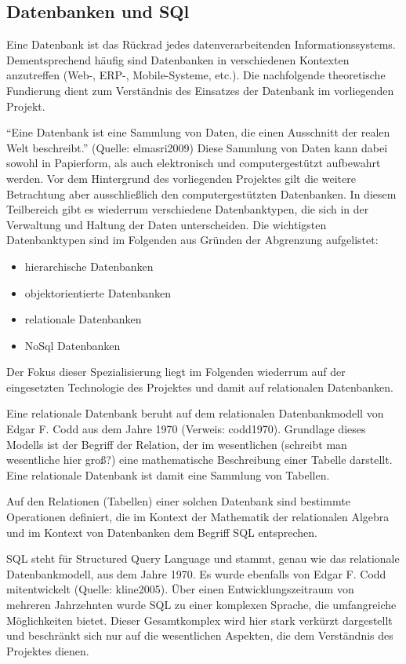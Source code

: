 \subsection{Datenbanken und SQl}
\label{sec:DatenbankenUndSql}

Eine Datenbank ist das Rückrad jedes datenverarbeitenden Informationssystems. Dementsprechend häufig sind Datenbanken in 
verschiedenen Kontexten anzutreffen (Web-, ERP-, Mobile-Systeme, etc.). Die nachfolgende theoretische Fundierung dient zum 
Verständnis des Einsatzes der Datenbank im vorliegenden Projekt.

"`Eine Datenbank ist eine Sammlung von Daten, die einen Ausschnitt der realen Welt beschreibt."' (Quelle: elmasri2009) 
Diese
Sammlung von Daten kann dabei sowohl in Papierform, als auch elektronisch und computergestützt aufbewahrt werden. Vor dem 
Hintergrund des vorliegenden Projektes gilt die weitere Betrachtung aber ausschließlich den computergestützten Datenbanken.
In diesem Teilbereich gibt es wiederrum verschiedene Datenbanktypen, die sich in der Verwaltung und Haltung der Daten 
unterscheiden. Die wichtigsten Datenbanktypen sind im Folgenden aus Gründen der Abgrenzung aufgelistet:

\begin{itemize}
  \item hierarchische Datenbanken
  \item objektorientierte Datenbanken
  \item relationale Datenbanken
  \item NoSql Datenbanken
\end{itemize}

Der Fokus dieser Spezialisierung liegt im Folgenden wiederrum auf der eingesetzten Technologie des Projektes und damit auf 
relationalen Datenbanken. 

Eine relationale Datenbank beruht auf dem relationalen Datenbankmodell von Edgar F. Codd aus dem Jahre 1970 (Verweis: 
codd1970). Grundlage dieses Modells ist der Begriff der Relation, der im wesentlichen (schreibt man wesentliche hier groß?)
eine mathematische Beschreibung einer Tabelle darstellt. Eine relationale Datenbank ist damit eine Sammlung von Tabellen.

Auf den Relationen (Tabellen) einer solchen Datenbank sind bestimmte Operationen definiert, die im Kontext der Mathematik 
der relationalen Algebra und im Kontext von Datenbanken dem Begriff SQL entsprechen.

SQL steht für Structured Query Language und stammt, genau wie das relationale Datenbankmodell, aus dem Jahre 1970. Es 
wurde ebenfalls von Edgar F. Codd mitentwickelt (Quelle: kline2005). Über einen Entwicklungszeitraum von mehreren Jahrzehnten 
wurde SQL zu einer komplexen Sprache, die umfangreiche Möglichkeiten bietet. Dieser Gesamtkomplex wird hier stark verkürzt
dargestellt und beschränkt sich nur auf die wesentlichen Aspekten, die dem Verständnis des Projektes dienen.

